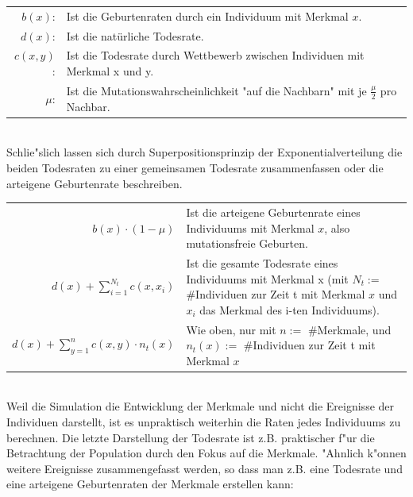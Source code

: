 \documentclass[11pt, a4paper, german]{article}
\begin{document}
	\begin{tabular}{r p{26em}}
		$ b(x) $: & Ist die Geburtenraten durch ein Individuum mit Merkmal $ x $.\\
		$ d(x) $: & Ist die natürliche Todesrate.\\
		$ c(x, y) $: & Ist die Todesrate durch Wettbewerb zwischen Individuen mit Merkmal x und y.\\
		$ \mu $: & Ist die Mutationswahrscheinlichkeit "{}auf die Nachbarn"{} mit je $ \frac{\mu}{2} $ pro Nachbar. \\
	\end{tabular}\\

	Schlie"slich lassen sich durch Superpositionsprinzip der Exponentialverteilung die beiden Todesraten zu einer gemeinsamen Todesrate zusammenfassen oder die arteigene Geburtenrate beschreiben.\\
	
	\begin{tabular}{ r p{18em} }
		$ b(x) \cdot (1 - \mu) $ & Ist die arteigene Geburtenrate eines Individuums mit Merkmal $ x $, also mutationsfreie Geburten.\\
		$ d(x) + \sum_{i=1}^{N_t} c(x, x_i) $ & Ist die gesamte Todesrate eines Individuums mit Merkmal x (mit $ N_t := $ \#Individuen zur Zeit t mit Merkmal $ x $ und $ x_i $ das Merkmal des i-ten Individuums).\\
		$ d(x) + \sum_{y=1}^{n} c(x,y) \cdot n_t(x) $ & Wie oben, nur mit $ n := $ \#Merkmale, und $ n_t(x) :=$ \#Individuen zur Zeit t mit Merkmal $ x $
	\end{tabular}\\

	Weil die Simulation die Entwicklung der Merkmale und nicht die Ereignisse der Individuen darstellt, ist es unpraktisch weiterhin die Raten jedes Individuums zu berechnen. Die letzte Darstellung der Todesrate ist z.B. praktischer f"ur die Betrachtung der Population durch den Fokus auf die Merkmale.  "Ahnlich k"onnen weitere Ereignisse zusammengefasst werden, so dass man z.B. eine Todesrate und eine arteigene Geburtenraten der Merkmale erstellen kann:
	
\end{document}
